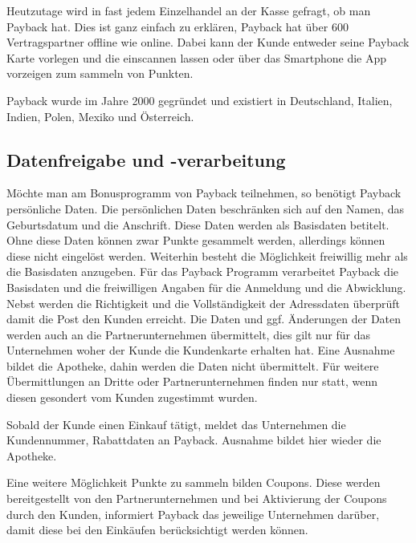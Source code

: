 \noindent Heutzutage wird in fast jedem Einzelhandel an der Kasse gefragt, ob man Payback hat. Dies ist ganz einfach zu erklären, Payback hat über 600 Vertragspartner offline wie online. Dabei kann der Kunde entweder seine Payback Karte vorlegen und die einscannen lassen oder über das Smartphone die App vorzeigen zum sammeln von Punkten. \cite{Payback} \newline

\noindent Payback wurde im Jahre 2000 gegründet und existiert in Deutschland, Italien, Indien, Polen, Mexiko und Österreich. \cite{Payback_Info} \newline

\subsection{Datenfreigabe und -verarbeitung}
Möchte man am Bonusprogramm von Payback teilnehmen, so benötigt Payback persönliche Daten. Die persönlichen Daten beschränken sich auf den Namen, das Geburtsdatum und die Anschrift. Diese Daten werden als Basisdaten betitelt. Ohne diese Daten können zwar Punkte gesammelt werden, allerdings können diese nicht eingelöst werden. Weiterhin besteht die Möglichkeit freiwillig mehr als die Basisdaten anzugeben. Für das Payback Programm verarbeitet Payback die Basisdaten und die freiwilligen Angaben für die Anmeldung und die Abwicklung. Nebst werden die Richtigkeit und die Vollständigkeit der Adressdaten überprüft damit die Post den Kunden erreicht. Die Daten und ggf. Änderungen der Daten werden auch an die Partnerunternehmen übermittelt, dies gilt nur für das Unternehmen woher der Kunde die Kundenkarte erhalten hat. Eine Ausnahme bildet die Apotheke, dahin werden die Daten nicht übermittelt. Für weitere Übermittlungen an Dritte oder Partnerunternehmen finden nur statt, wenn diesen gesondert vom Kunden zugestimmt wurden. \newline

\noindent Sobald der Kunde einen Einkauf tätigt, meldet das Unternehmen die Kundennummer, Rabattdaten an Payback.  Ausnahme bildet hier wieder die Apotheke. \newline

\noindent Eine weitere Möglichkeit Punkte zu sammeln bilden Coupons. Diese werden bereitgestellt von den Partnerunternehmen und bei Aktivierung der Coupons durch den Kunden, informiert Payback das jeweilige Unternehmen darüber, damit diese bei den Einkäufen berücksichtigt werden können. \newline

